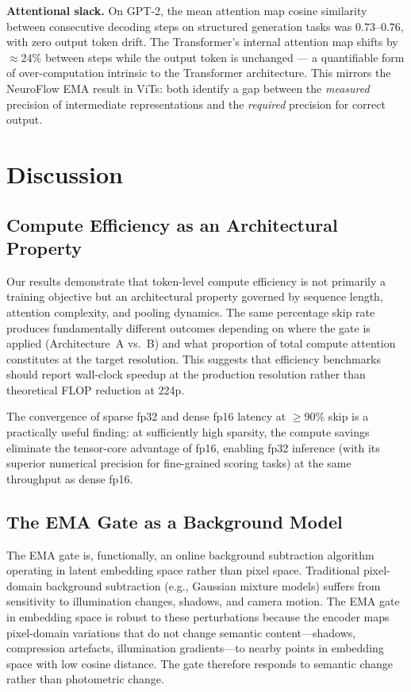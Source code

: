 \documentclass{article}
\begin{document}
\textbf{Attentional slack.}
On GPT-2, the mean attention map cosine similarity between consecutive
decoding steps on structured generation tasks was 0.73--0.76, with zero
output token drift. The Transformer's internal attention map shifts by
$\approx$24\% between steps while the output token is unchanged --- a
quantifiable form of over-computation intrinsic to the Transformer
architecture. This mirrors the NeuroFlow EMA result in ViTs: both identify
a gap between the \emph{measured} precision of intermediate representations
and the \emph{required} precision for correct output.

\section{Discussion}\label{discussion}

\subsection{Compute Efficiency as an Architectural Property}
\label{sec:efficiency-architectural-property}

Our results demonstrate that token-level compute efficiency is not
primarily a training objective but an architectural property governed by
sequence length, attention complexity, and pooling dynamics. The same
percentage skip rate produces fundamentally different outcomes depending
on where the gate is applied (Architecture~A vs.\ B) and what proportion
of total compute attention constitutes at the target resolution. This
suggests that efficiency benchmarks should report wall-clock speedup at
the production resolution rather than theoretical FLOP reduction at 224p.

The convergence of sparse fp32 and dense fp16 latency at $\geq$90\% skip
is a practically useful finding: at sufficiently high sparsity, the
compute savings eliminate the tensor-core advantage of fp16, enabling
fp32 inference (with its superior numerical precision for fine-grained
scoring tasks) at the same throughput as dense fp16.

\subsection{The EMA Gate as a Background Model}
\label{sec:ema-background-model}

The EMA gate is, functionally, an online background subtraction algorithm
operating in latent embedding space rather than pixel space. Traditional
pixel-domain background subtraction (e.g., Gaussian mixture models)
suffers from sensitivity to illumination changes, shadows, and camera
motion. The EMA gate in embedding space is robust to these perturbations
because the encoder maps pixel-domain variations that do not change
semantic content---shadows, compression artefacts, illumination
gradients---to nearby points in embedding space with low cosine distance.
The gate therefore responds to semantic change rather than photometric
change.
\end{document}
